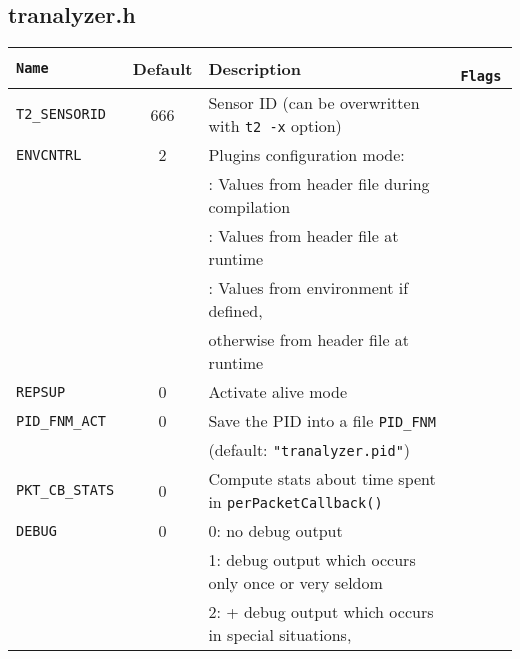 \subsection{tranalyzer.h}\label{tranalyzer.h}
\begin{longtable}{>{\tt}lcl>{\tt\small}l}
    \toprule
    {\bf Name}               & {\bf Default}      & {\bf Description}                                                   & {\bf Flags}\\
    \midrule\endhead%
    T2\_SENSORID             & 666                & Sensor ID (can be overwritten with {\tt t2 -x} option)              & \\
    ENVCNTRL                 & 2                  & Plugins configuration mode:                                         & \\
                             &                    & \quad 0: Values from header file during compilation                 & \\
                             &                    & \quad 1: Values from header file at runtime                         & \\
                             &                    & \quad 2: Values from environment if defined,                        & \\
                             &                    & \qquad otherwise from header file at runtime                        & \\
    REPSUP                   & 0                  & Activate alive mode                                                 & \\
    PID\_FNM\_ACT            & 0                  & Save the PID into a file {\tt\small PID\_FNM}                       & \\
                             &                    & (default: {\tt\small "tranalyzer.pid"})                             & \\
    PKT\_CB\_STATS           & 0                  & Compute stats about time spent in {\tt\small perPacketCallback()}   & \\
    DEBUG                    & 0                  & 0: no debug output                                                  & \\
                             &                    & 1: debug output which occurs only once or very seldom               & \\
                             &                    & 2: + debug output which occurs in special situations,               & \\

\end{longtable}

